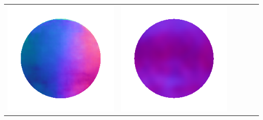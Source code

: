 \begin{center}
\begin{tabularx}{\linewidth}{@{}Y@{}Y@{}Y@{}Y@{}Y@{}Y@{}}
\includegraphics[width=\linewidth]{semisynthetic/20160617_13_marrnet_out.png} &
\includegraphics[width=\linewidth]{semisynthetic/20160617_13_ef_out.png} \\

\end{tabularx}
\end{center}
